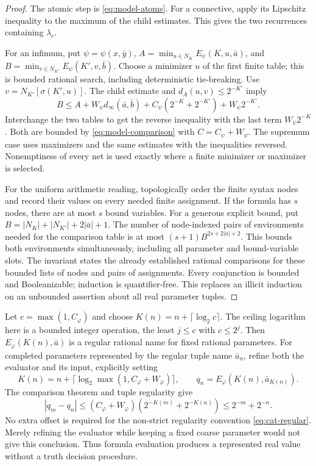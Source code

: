 \begin{proof}
The atomic step is \eqref{eq:model-atoms}. For a connective, apply its
Lipschitz inequality to the maximum of the child estimates. This gives the
two recurrences containing $\lambda_c$.

For an infimum, put $\psi=\psi(x,\bar y)$,
$A=\min_{u\in N_K}E_\psi(K,u,\bar a)$, and
$B=\min_{v\in N_{K'}}E_\psi(K',v,\bar b)$.
Choose a minimizer $u$ of the first finite table; this is bounded rational
search, including deterministic tie-breaking. Use
$v=N_{K'}[\sigma(K',u)]$. The child estimate and
$d_A(u,v)\leq2^{-K'}$ imply
\[
 B\leq A+W_\psi d_\infty(\bar a,\bar b)
       +C_\psi(2^{-K}+2^{-K'})+W_\psi2^{-K'}.
\]
Interchange the two tables to get the reverse inequality with the last
term $W_\psi2^{-K}$. Both are bounded by
\eqref{eq:model-comparison} with $C=C_\psi+W_\psi$.
The supremum case uses maximizers and the same estimates with the
inequalities reversed. Nonemptiness of every net is used exactly where a
finite minimizer or maximizer is selected.

For the uniform arithmetic reading, topologically order the finite syntax
nodes and record their values on every needed finite assignment. If the
formula has $s$ nodes, there are at most $s$ bound variables. For a generous explicit bound, put
$B=|N_K|+|N_{K'}|+2|\bar a|+1$. The number of node-indexed pairs of
environments needed for the comparison table is at most
$(s+1)B^{2s+2|\bar a|+2}$. This bounds both environments simultaneously,
including all parameter and bound-variable slots. The invariant states the
already established rational comparisons for these bounded lists of nodes
and pairs of assignments. Every conjunction is bounded and
Booleanizable; induction is quantifier-free. This replaces an illicit
induction on an unbounded assertion about all real parameter tuples.
\end{proof}

Let $c=\max(1,C_\varphi)$ and choose
$K(n)=n+\lceil\log_2 c\rceil$. The ceiling logarithm here is a bounded
integer operation, the least $j\leq c$ with $c\leq2^j$.
Then $E_\varphi(K(n),\bar a)$ is a regular rational name for fixed rational
parameters. For completed parameters represented by the regular tuple name
$\bar a_n$, refine both the evaluator and its input, explicitly setting
\[
 K(n)=n+\lceil\log_2\max(1,C_\varphi+W_\varphi)\rceil,
 \qquad q_n=E_\varphi(K(n),\bar a_{K(n)}).
\]
The comparison theorem and tuple regularity give
\[
 |q_m-q_n|\leq(C_\varphi+W_\varphi)
       (2^{-K(m)}+2^{-K(n)})\leq2^{-m}+2^{-n}.
\]
No extra offset is required for the non-strict regularity convention
\eqref{eq:cat-regular}. Merely refining the evaluator while keeping a
fixed coarse parameter would not give this conclusion. Thus formula
evaluation produces a represented real value without a truth decision
procedure.


